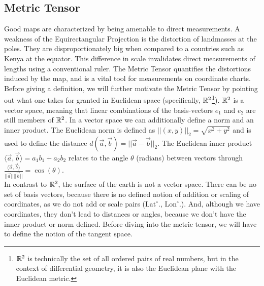 \subsection*{Metric Tensor}
Good maps are characterized by being amenable to direct measurements. A weakness of the Equirectangular Projection is the distortion of landmasses at the poles. They are disproportionately big when compared to a countries such as Kenya at the equator. This difference in scale invalidates direct measurements of lengths using a conventional ruler. The Metric Tensor quantifies the distortions induced by the map, and is a vital tool for measurements on coordinate charts.
Before giving a definition, we will further motivate the Metric Tensor by pointing out what one takes for granted in Euclidean space (specifically, $\mathbb{R}^2$\footnote{$\mathbb{R}^2$ is technically the set of all ordered pairs of real numbers, but in the context of differential geometry, it is also the Euclidean plane with the Euclidean metric.}). $\mathbb{R}^2$ is a vector space, meaning that linear combinations of the basis-vectors $e_1$ and $e_2$ are still members of $\mathbb{R}^2$. In a vector space we can additionally define a norm and an inner product. The Euclidean norm is defined as $||(x,y)||_2 = \sqrt{x^2 + y^2}$ and is used to define the distance $d(\vec{a}, \vec{b}) = ||\vec{a}-\vec{b}||_2$. The Euclidean inner product $\langle \vec{a},\vec{b} \rangle = a_1b_1 +a_2b_2$ relates to the angle $\theta$ (radians) between vectors through $\frac{\langle \vec{a},\vec{b} \rangle}{||\vec{a}||||\vec{b}||} = \cos(\theta)$.
\\
In contrast to $\mathbb{R}^2$, the surface of the earth is not a vector space. There can be no set of basis vectors, because there is no defined notion of addition or scaling of coordinates, as we do not add or scale pairs ($\text{Lat}^\circ$., $\text{Lon}^\circ$.). And, although we have coordinates, they don't lead to distances or angles, because we don't have the inner product or norm defined. Before diving into the metric tensor, we will have to define the notion of the tangent space.

